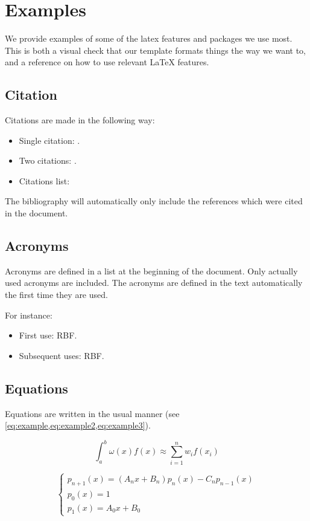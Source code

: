 \section{Examples}
We provide examples of some of the latex features and packages we use most.
This is both a visual check that our template formats things the way we
want to, and a reference on how to use relevant LaTeX features.

\subsection{Citation}
Citations are made in the following way:
\begin{itemize}
\item Single citation: \cite{Gehrels:2016}.
\item Two citations: \cite{inkscape,gnuplot}.
\item Citations list: \cite{inkscape,gnuplot,thomashoullier/alarm-clock}
\end{itemize}

The bibliography will automatically only include the references which
were cited in the document.

\subsection{Acronyms}
Acronyms are defined in a list at the beginning of the document. Only
actually used acronyms are included. The acronyms are defined in the text
automatically the first time they are used.

For instance:
\begin{itemize}
\item First use: \gls{RBF}.
\item Subsequent uses: \gls{RBF}.
\end{itemize}

\subsection{Equations}
Equations are written in the usual manner (see
\cref{eq:example,eq:example2,eq:example3}).

\begin{equation} \label{eq:example}
\int_{a}^{b} \omega(x) f(x) \approx \sum_{i=1}^n w_i f(x_i)
\end{equation}

\begin{equation} \label{eq:example2}
\begin{cases}
p_{n+1}(x) = (A_n x + B_n) p_n(x) - C_n p_{n-1}(x) \\
p_0(x) = 1 \\
p_1(x) = A_0 x + B_0
\end{cases}
\end{equation}

